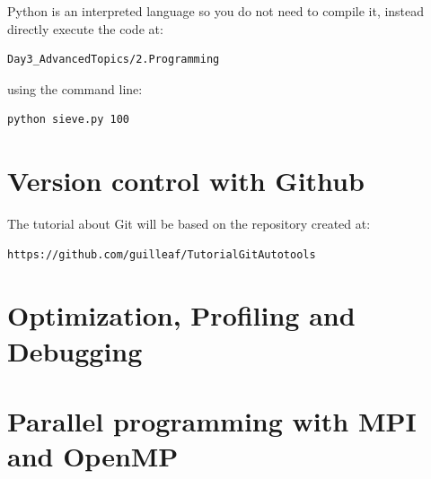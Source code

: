 Python is an interpreted language so you do not need to compile it, instead directly execute the code at:

\begin{lstlisting}
Day3_AdvancedTopics/2.Programming
\end{lstlisting}

using the command line:

\begin{lstlisting}
python sieve.py 100
\end{lstlisting}


% 
% 
% 
% 
% 



\section{Version control with Github}

The tutorial about Git will be based on the repository created at:

\begin{lstlisting}
https://github.com/guilleaf/TutorialGitAutotools
\end{lstlisting}


\section{Optimization, Profiling and Debugging}
\section{Parallel programming with MPI and OpenMP}

